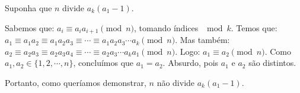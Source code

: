 Suponha que $n$ divide $a_k(a_1-1)$.

Sabemos que: $a_i \equiv a_ia_{i+1} \pmod{n}$, tomando índices $\mod{k}$.
Temos que: $a_1 \equiv a_1a_2 \equiv a_1a_2a_3 \equiv \cdots \equiv a_1a_2a_3\cdots a_k \pmod{n}$.
Mas também: $a_2 \equiv a_2a_3 \equiv a_2a_3a_4 \equiv \cdots \equiv a_2a_3\cdots a_ka_1 \pmod{n}$.
Logo: $a_1 \equiv a_2 \pmod{n}$. Como $a_1, a_2 \in \{1, 2, \cdots, n\}$, concluímos que $a_1 = a_2$.
Absurdo, pois $a_1$ e $a_2$ são distintos.

Portanto, como queríamos demonstrar, $n$ não divide $a_k(a_1-1)$.